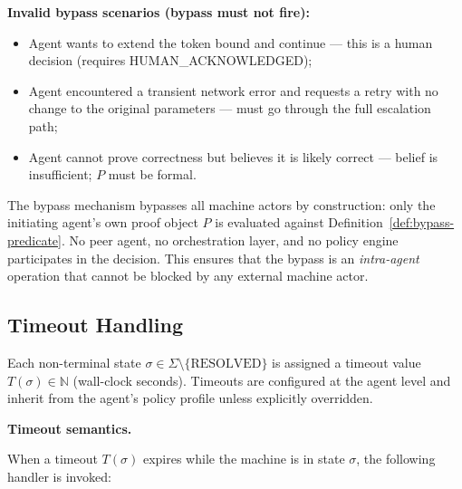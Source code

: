 \bigskip
\noindent\textbf{Invalid bypass scenarios (bypass must not fire):}

\begin{itemize}
  \item Agent wants to extend the token bound and continue --- this is
        a human decision (requires HUMAN\_ACKNOWLEDGED);
  \item Agent encountered a transient network error and requests a retry
        with no change to the original parameters --- must go through
        the full escalation path;
  \item Agent cannot prove correctness but believes it is likely correct ---
        belief is insufficient; $P$ must be formal.
\end{itemize}

\bigskip
The bypass mechanism bypasses all machine actors by construction:
only the initiating agent's own proof object $P$ is evaluated against
Definition~\ref{def:bypass-predicate}.  No peer agent, no orchestration
layer, and no policy engine participates in the decision.  This ensures
that the bypass is an \emph{intra-agent} operation that cannot be blocked
by any external machine actor.


\subsection{Timeout Handling}

Each non-terminal state $\sigma \in \Sigma \setminus \{\text{RESOLVED}\}$
is assigned a timeout value $T(\sigma) \in \mathbb{N}$ (wall-clock seconds).
Timeouts are configured at the agent level and inherit from the
agent's policy profile unless explicitly overridden.

\bigskip
\noindent\textbf{Timeout semantics.}

When a timeout $T(\sigma)$ expires while the machine is in state $\sigma$,
the following handler is invoked:

